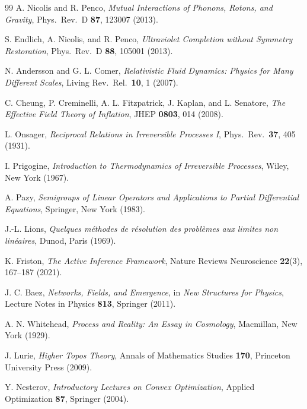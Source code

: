 \documentclass[12pt, a4paper]{article}
\theoremstyle{plain}
\theoremstyle{definition}
\theoremstyle{remark}
\begin{document}
\begin{thebibliography}{99}
A. Nicolis and R. Penco,
\textit{Mutual Interactions of Phonons, Rotons, and Gravity},
Phys.\ Rev.\ D \textbf{87}, 123007 (2013).

S. Endlich, A. Nicolis, and R. Penco,
\textit{Ultraviolet Completion without Symmetry Restoration},
Phys.\ Rev.\ D \textbf{88}, 105001 (2013).

N. Andersson and G. L. Comer,
\textit{Relativistic Fluid Dynamics: Physics for Many Different Scales},
Living Rev.\ Rel.\ \textbf{10}, 1 (2007).

C. Cheung, P. Creminelli, A. L. Fitzpatrick, J. Kaplan, and L. Senatore,
\textit{The Effective Field Theory of Inflation},
JHEP \textbf{0803}, 014 (2008).

L. Onsager,
\textit{Reciprocal Relations in Irreversible Processes I},
Phys.\ Rev.\ \textbf{37}, 405 (1931).

I. Prigogine,
\textit{Introduction to Thermodynamics of Irreversible Processes},
Wiley, New York (1967).

A. Pazy,
\textit{Semigroups of Linear Operators and Applications to Partial Differential Equations},
Springer, New York (1983).

J.-L. Lions,
\textit{Quelques méthodes de résolution des problèmes aux limites non linéaires},
Dunod, Paris (1969).

K. Friston,
\textit{The Active Inference Framework},
Nature Reviews Neuroscience \textbf{22}(3), 167--187 (2021).

J. C. Baez,
\textit{Networks, Fields, and Emergence},
in \textit{New Structures for Physics}, Lecture Notes in Physics \textbf{813},
Springer (2011).

A. N. Whitehead,
\textit{Process and Reality: An Essay in Cosmology},
Macmillan, New York (1929).

J. Lurie,
\textit{Higher Topos Theory},
Annals of Mathematics Studies \textbf{170},
Princeton University Press (2009).

Y. Nesterov,
\textit{Introductory Lectures on Convex Optimization},
Applied Optimization \textbf{87}, Springer (2004).

\end{thebibliography}
\end{document}

